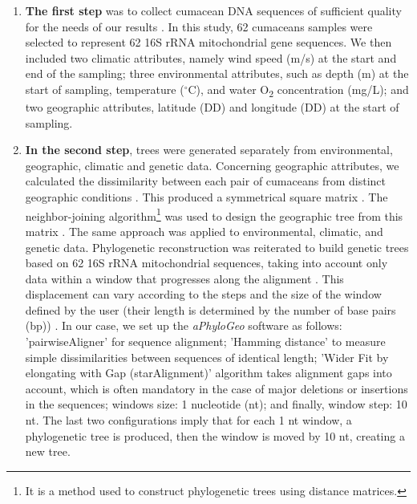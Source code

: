 \begin{enumerate}
\item \textbf{The first step} was to collect cumacean DNA sequences of sufficient quality for the needs of our results \citep{koshkarov_phylogeography_2022}. In this study, 62 cumaceans samples were selected to represent 62 16S rRNA mitochondrial gene sequences. We then included two climatic attributes, namely wind speed (m/s) at the start and end of the sampling; three environmental attributes, such as depth (m) at the start of sampling, temperature ($^\circ$C), and water O\textsubscript{2} concentration (mg/L); and two geographic attributes, latitude (DD) and longitude (DD) at the start of sampling.

\item \textbf{In the second step}, trees were generated separately from environmental, geographic, climatic and genetic data. Concerning geographic attributes, we calculated the dissimilarity between each pair of cumaceans from distinct geographic conditions \citep{koshkarov_phylogeography_2022}. This produced a symmetrical square matrix \citep{koshkarov_phylogeography_2022}. The {neighbor-joining algorithm}\footnote{It is a method used to construct phylogenetic trees using distance matrices.} was used to design the geographic tree from this matrix \citep{koshkarov_phylogeography_2022}. The same approach was applied to environmental, climatic, and genetic data. Phylogenetic reconstruction was reiterated to build genetic trees based on 62 16S rRNA mitochondrial sequences, taking into account only data within a window that progresses along the alignment \citep{koshkarov_phylogeography_2022}. This displacement can vary according to the steps and the size of the window defined by the user (their length is determined by the number of base pairs (bp)) \citep{koshkarov_phylogeography_2022}. In our case, we set up the \textit{aPhyloGeo} software as follows: 'pairwiseAligner' for sequence alignment; 'Hamming distance' to measure simple dissimilarities between sequences of identical length; 'Wider Fit by elongating with Gap (starAlignment)' algorithm takes alignment gaps into account, which is often mandatory in the case of major deletions or insertions in the sequences; windows size: 1 nucleotide (nt); and finally, window step: 10 nt. The last two configurations imply that for each 1 nt window, a phylogenetic tree is produced, then the window is moved by 10 nt, creating a new tree.


\end{enumerate}
